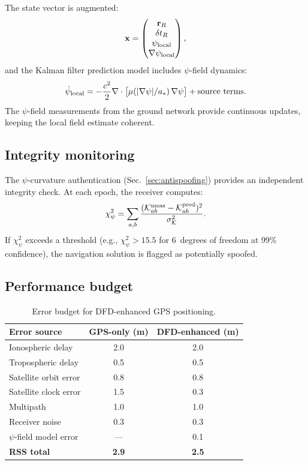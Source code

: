 \documentclass[aps,prd,twocolumn,superscriptaddress,nofootinbib]{revtex4-2}
\newcommand{\astar}{a_*}
\begin{document}
The state vector is augmented:
\begin{equation}\label{eq:state}
\mathbf{x} = \begin{pmatrix} \mathbf{r}_R \\ \delta t_R \\
\psi_{\rm local} \\ \nabla\psi_{\rm local} \end{pmatrix},
\end{equation}
and the Kalman filter prediction model includes $\psi$-field dynamics:
\begin{equation}\label{eq:prediction}
\dot{\psi}_{\rm local} = -\frac{c^2}{2}\nabla\cdot
\bigl[\mu(|\nabla\psi|/\astar)\,\nabla\psi\bigr] + \text{source terms}.
\end{equation}
The $\psi$-field measurements from the ground network provide
continuous updates, keeping the local field estimate coherent.

\subsection{Integrity monitoring}\label{sec:integrity}

The $\psi$-curvature authentication (Sec.~\ref{sec:antispoofing})
provides an independent integrity check. At each epoch, the
receiver computes:
\begin{equation}\label{eq:integrity}
\chi^2_\psi = \sum_{a,b}\frac{(\mathcal{K}_{ab}^{\rm meas}
- \mathcal{K}_{ab}^{\rm pred})^2}{\sigma_{\mathcal{K}}^2}.
\end{equation}
If $\chi^2_\psi$ exceeds a threshold (e.g., $\chi^2_\psi > 15.5$ for
6~degrees of freedom at 99\% confidence), the navigation solution is
flagged as potentially spoofed.

\subsection{Performance budget}\label{sec:budget}

\begin{table}[t]
\caption{Error budget for DFD-enhanced GPS positioning.}
\label{tab:error-budget}
\begin{ruledtabular}
\begin{tabular}{lcc}
Error source & GPS-only (m) & DFD-enhanced (m) \\
\hline
Ionospheric delay & 2.0 & 2.0 \\
Tropospheric delay & 0.5 & 0.5 \\
Satellite orbit error & 0.8 & 0.8 \\
Satellite clock error & 1.5 & 0.3 \\
Multipath & 1.0 & 1.0 \\
Receiver noise & 0.3 & 0.3 \\
$\psi$-field model error & --- & 0.1 \\
\hline
\textbf{RSS total} & \textbf{2.9} & \textbf{2.5} \\
\end{tabular}
\end{ruledtabular}
\end{table}
\end{document}
